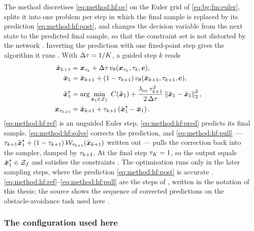 The method discretises \eqref{eq:method:hf:oc} on the Euler grid of \eqref{eq:bg:fm:euler}, splits it into
one problem per step in which the final sample is replaced by its prediction
\eqref{eq:method:hf:post}, and changes the decision variable from the next state to the predicted final
sample, so that the constraint set is not distorted by the network \parencite[Problems~2--5]{li2025hardflow}.
Inverting the prediction with one fixed-point step gives the algorithm it runs
\parencite[Algorithm~1]{li2025hardflow}. With $\Delta\tau = 1/K$, a guided step $k$ reads
\begin{align}
  \bar{\boldsymbol{x}}_{k+1} &= \boldsymbol{x}_{\tau_{k}}
    + \Delta\tau\,v_{\theta}(\boldsymbol{x}_{\tau_{k}},\tau_{k},\boldsymbol{c}),
    \label{eq:method:hf:ref}\\
  \bar{\boldsymbol{x}}_{1} &= \bar{\boldsymbol{x}}_{k+1}
    + (1-\tau_{k+1})\,v_{\theta}(\bar{\boldsymbol{x}}_{k+1},\tau_{k+1},\boldsymbol{c}),
    \label{eq:method:hf:pred}\\
  \hat{\boldsymbol{x}}_{1}^{\star} &= \arg\min_{\hat{\boldsymbol{x}}_{1}\in\mathcal{Z}_{f}}\;
    C(\hat{\boldsymbol{x}}_{1})
    + \frac{\lambda_{\textrm{oc}}\,\tau_{k+1}^{2}}{2\,\Delta\tau}\left\|\hat{\boldsymbol{x}}_{1}-\bar{\boldsymbol{x}}_{1}\right\|_{2}^{2},
    \label{eq:method:hf:solve}\\
  \boldsymbol{x}_{\tau_{k+1}} &= \bar{\boldsymbol{x}}_{k+1} + \tau_{k+1}\left(\hat{\boldsymbol{x}}_{1}^{\star}-\bar{\boldsymbol{x}}_{1}\right).
    \label{eq:method:hf:pull}
\end{align}
\eqref{eq:method:hf:ref} is an unguided Euler step, \eqref{eq:method:hf:pred} predicts its final sample,
\eqref{eq:method:hf:solve} corrects the prediction, and \eqref{eq:method:hf:pull} ---
$\tau_{k+1}\hat{\boldsymbol{x}}_{1}^{\star} + (1-\tau_{k+1})\,\mathcal{W}_{\tau_{k+1}}(\bar{\boldsymbol{x}}_{k+1})$
written out --- pulls the correction back into the sampler, damped by $\tau_{k+1}$. At the final step
$\tau_{K} = 1$, so the output equals $\hat{\boldsymbol{x}}_{1}^{\star}\in\mathcal{Z}_{f}$ and satisfies the
constraints \parencite[Prop.~1]{li2025hardflow}. The optimisation runs only in the later sampling
steps, where the prediction \eqref{eq:method:hf:post} is accurate \parencite{li2025hardflow}.
\eqref{eq:method:hf:ref}--\eqref{eq:method:hf:pull} are the steps of
\parencite[Alg.~1]{li2025hardflow}, written in the notation of this thesis; the source shows the
sequence of corrected predictions on the obstacle-avoidance task used here
\parencite[Fig.~11]{li2025hardflow}.

\subsubsection*{The configuration used here}

